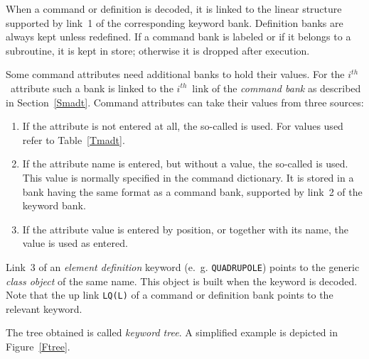 When a command or definition is decoded,
it is linked to the linear structure supported by link~1
of the corresponding keyword bank.
Definition banks are always kept unless redefined.
If a command bank is labeled or if it belongs to a subroutine,
it is kept in store;
otherwise it is dropped after execution.
 
Some command attributes need additional banks to hold their values.
For the $i^{th}$~attribute such a bank is linked to the $i^{th}$~link
of the {\em command bank} as described in
Section~\ref{Smadt}.
Command attributes can take their values from three sources:
 
\begin{enumerate}
\item
If the attribute is not entered at all,
the so-called  is used.
For values used refer to Table~\ref{Tmadt}.
\item
If the attribute name is entered, but without a value,
the so-called  is used.
This value is normally specified in the command dictionary.
It is stored in a bank having the same format as a command bank, 
supported by link~2 of the keyword bank.
\item
If the attribute value is entered by position,
or together with its name, the value is used as entered.
\end{enumerate}
 
Link~3 of an {\em element definition}
keyword (e.~g. {\tt QUADRUPOLE}) points to the generic
{\em class object} of the same name.
This object is built when the keyword is decoded.
Note that the up link {\tt LQ(L)} of a command or definition bank
points to the relevant keyword.
 
The tree obtained is called {\em keyword tree}.
A simplified example is depicted in Figure~\ref{Ftree}.
 
